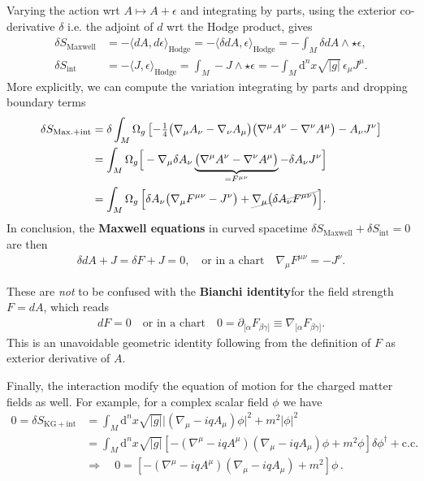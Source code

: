 \documentclass[../geometry_main.tex]{subfiles}
\begin{document}
\begin{mytheorem}
%
Varying the action wrt $A\mapsto A+\epsilon $ and integrating by parts, using the exterior co-derivative $\delta$ i.e. the adjoint of $d$ wrt the Hodge product, gives
\begin{align}
    \delta S_{\mathrm{Maxwell}} &= -\langle dA, d\epsilon \rangle_{\mathrm{Hodge}} = - \langle \delta dA, \epsilon \rangle_{\mathrm{Hodge}} = -\int_M \delta d A\wedge \star \epsilon,
    \\
    \delta S_{\mathrm{int}} &= -\langle J,\epsilon\rangle_{\mathrm{Hodge}}=\int_M - J \wedge \star \epsilon= -\int_M\!\!\mathrm{d}^n x\sqrt{|g|}\, \epsilon_\mu J^\mu.
\end{align}
%
More explicitly, we can compute the variation integrating by parts and dropping boundary terms
\begin{align}
    \delta S_{\mathrm{Max.}+\mathrm{int}} &= \delta \int_M \Omega_g \left[-\tfrac{1}{4} \big(\nabla_\mu A_\nu - \nabla_\nu A_\mu\big)\big(\nabla^\mu A^\nu - \nabla^\nu A^\mu\big)- A_\nu J^\nu\right]
    \\
    &= \int_M \Omega_g  \Big[-\nabla_\mu \delta A_\nu \underbrace{\big(\nabla^\mu A^\nu - \nabla^\nu A^\mu\big)}_{=F^{\mu\nu}} - \delta A_\nu J^\nu \Big]
    \\
    &= \int_M \Omega_g\, \Big[\delta A_\nu \big(\nabla_\mu F^{\mu\nu} - J^\nu \big) + \graycancel{\nabla_\mu\big(\delta A_\nu F^{\mu\nu}\big)}\Big].
\end{align}
In conclusion, the \textbf{Maxwell equations} in curved spacetime $\delta S_{\mathrm{Maxwell}} + \delta S_{\mathrm{int}}=0$ are then
\begin{align}
    \delta d A +J= \delta F +J= 0, \quad \text{or in a chart} \quad \nabla_\mu F^{\mu\nu} = -J^\nu.
\end{align}

These are \emph{not} to be confused with the \textbf{Bianchi identity} for the field strength $F=dA$, which reads
\begin{align}
    dF=0\quad \text{or in a chart} \quad  0=\partial_{[\alpha} F_{\beta\gamma]}\equiv \nabla_{[\alpha} F_{\beta\gamma]}.
\end{align}
This is an unavoidable geometric identity following from the definition of $F$ as exterior derivative of $A$.

Finally, the interaction modify the equation of motion for the charged matter fields as well.
For example, for a complex scalar field $\phi$ we have
\begin{align}
    0 = \delta S_{\mathrm{KG}+ \mathrm{int}} &= \int_M \mathrm{d}^n x \sqrt{|g|} \big|\left(\nabla_\mu -iq A_\mu\right)\phi\big|^2 + m^2 |\phi|^2
    \\
    &= \int_M \mathrm{d}^n x \sqrt{|g|} \left[ -\left(\nabla^\mu - i q A^\mu\right)\left(\nabla_\mu - i q A_\mu\right) \phi + m^2 \phi \right] \delta \phi^\dagger + \text{c.c.}
    \\
    &\Rightarrow \quad 0 = \left[ -\left(\nabla^\mu - i q A^\mu\right)\left(\nabla_\mu - i q A_\mu\right) + m^2 \right] \phi\, .
\end{align}
%
\end{mytheorem}
\end{document}
